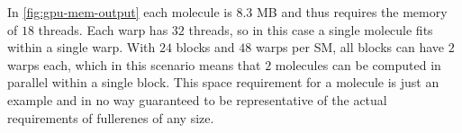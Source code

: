 In \autoref{fig:gpu-mem-output} each molecule is $8.3$ MB and thus requires the memory of $18$ threads. Each warp has $32$ threads, so in this case a single molecule fits within a single warp. With $24$ blocks and $48$ warps per SM, all blocks can have $2$ warps each, which in this scenario means that $2$ molecules can be computed in parallel within a single block. This space requirement for a molecule is just an example and in no way guaranteed to be representative of the actual requirements of fullerenes of any size.


%
%




